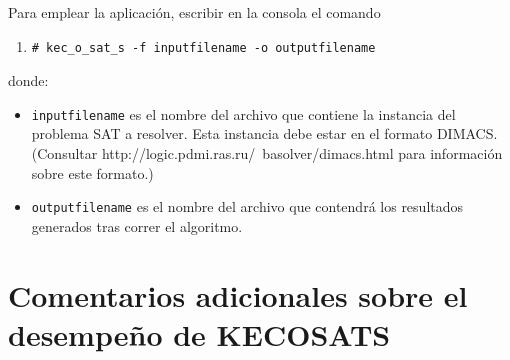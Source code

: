 \documentclass[12pt,lettersize,oneside]{article}
\begin{document}
Para emplear la aplicación, escribir en la consola el comando
\begin{enumerate}
\item \begin{lstlisting}[style=consola]
# kec_o_sat_s -f inputfilename -o outputfilename 
\end{lstlisting}
\end{enumerate}
\noindent donde:
\vspace{-2.5mm}
\begin{itemize}
\item {\tt inputfilename} es el nombre del archivo que contiene la instancia del
  problema SAT a resolver. Esta instancia debe estar en el formato DIMACS.
(Consultar http://logic.pdmi.ras.ru/~basolver/dimacs.html para información sobre
este formato.)
\item {\tt outputfilename} es el nombre del archivo que contendrá los resultados
  generados tras correr el algoritmo.
\end{itemize}


\section{Comentarios adicionales sobre el desempeño de KECOSATS}
\end{document}
